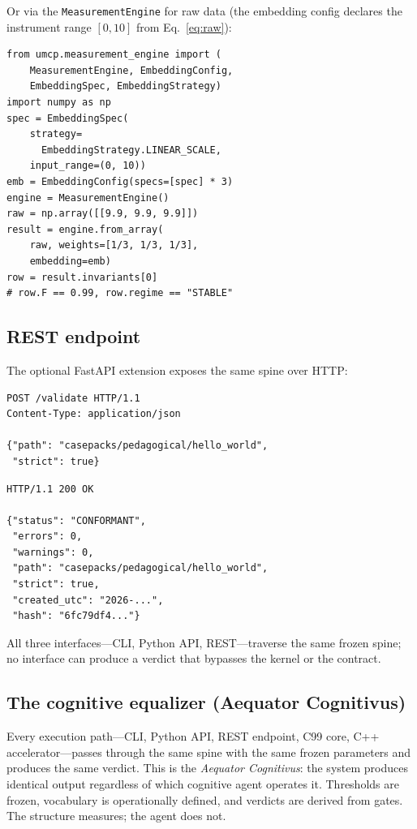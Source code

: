 \documentclass[
  aps,
  prd,
  twocolumn,
  superscriptaddress,
  nofootinbib,
  floatfix
]{revtex4-2}
\begin{document}
Or via the \texttt{MeasurementEngine} for raw data
(the embedding config declares the instrument range
$[0, 10]$ from Eq.~\eqref{eq:raw}):

\begin{Verbatim}[fontsize=\small]
from umcp.measurement_engine import (
    MeasurementEngine, EmbeddingConfig,
    EmbeddingSpec, EmbeddingStrategy)
import numpy as np
spec = EmbeddingSpec(
    strategy=
      EmbeddingStrategy.LINEAR_SCALE,
    input_range=(0, 10))
emb = EmbeddingConfig(specs=[spec] * 3)
engine = MeasurementEngine()
raw = np.array([[9.9, 9.9, 9.9]])
result = engine.from_array(
    raw, weights=[1/3, 1/3, 1/3],
    embedding=emb)
row = result.invariants[0]
# row.F == 0.99, row.regime == "STABLE"
\end{Verbatim}

\subsection{REST endpoint}

The optional FastAPI extension exposes the same spine over HTTP:

\begin{Verbatim}[fontsize=\small]
POST /validate HTTP/1.1
Content-Type: application/json

{"path": "casepacks/pedagogical/hello_world",
 "strict": true}
\end{Verbatim}

\begin{Verbatim}[fontsize=\small]
HTTP/1.1 200 OK

{"status": "CONFORMANT",
 "errors": 0,
 "warnings": 0,
 "path": "casepacks/pedagogical/hello_world",
 "strict": true,
 "created_utc": "2026-...",
 "hash": "6fc79df4..."}
\end{Verbatim}

All three interfaces---CLI, Python API, REST---traverse the same
frozen spine; no interface can produce a verdict that bypasses the
kernel or the contract.

\subsection{The cognitive equalizer (Aequator Cognitivus)}

Every execution path---CLI, Python API, REST endpoint, C99 core,
C++ accelerator---passes through the same spine with the same frozen
parameters and produces the same verdict.  This is the
\emph{Aequator Cognitivus}: the system produces identical output
regardless of which cognitive agent operates it.  Thresholds are
frozen, vocabulary is operationally defined, and verdicts are derived
from gates.  The structure measures; the agent does not.
\end{document}
